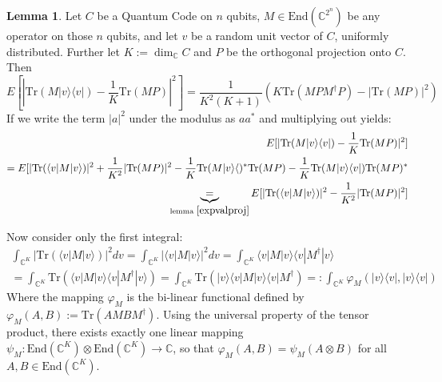 \documentclass{article}
\def\C{\mathbb{C}}
\def\End{\text{End}}
\def\Tr{\text{Tr}}
\theoremstyle{definition}
\newtheorem{lem}[Satz]{Lemma}
\begin{document}
\begin{lem}\label{expvalvec}
Let $C$ be a Quantum Code on $n$ qubits, $M \in \End(\C^{2^n})$ be any operator on those $n$ qubits, and let $v$ be a random unit vector of $C$, uniformly distributed. Further let $K:= \dim_\C C$ and $P$ be the orthogonal projection onto $C$. Then
\begin{equation} E[|\Tr(M|v\rangle \langle v|) - \frac{1}{K}\Tr(MP)|^2] = \frac{1}{K^2(K+1)}(K \Tr(MPM^\dagger P) - |\Tr(MP)|^2) \end{equation}
If we write the term $|a|^2$ under the modulus as $a a^*$ and multiplying out yields:
\begin{align*}
E[|\Tr(M|v\rangle \langle v|) - \frac{1}{K}\Tr(MP)|^2] \\ = E[ |\Tr(\langle v | M | v \rangle )|^2 + \frac{1}{K^2} | \Tr(MP)|^2 - \frac{1}{K} \Tr(M |v \rangle \langle)^* \Tr(MP) - \frac{1}{K} \Tr(M |v\rangle \langle v|) \Tr(MP)^* \\
\underbrace{=}_{\text{lemma }\ref{expvalproj}} E[|\Tr( \langle v|M|v\rangle)|^2 - \frac{1}{K^2}|\Tr(MP)|^2]
\end{align*}

Now consider only the first integral: 
\begin{align*}
\int_{\C^K} |\Tr( \langle v|M|v\rangle)|^2 dv = \int_{\C^K} |\langle v|M|v\rangle|^2 dv =  \int_{\C^K} \langle v|M|v\rangle  \langle v|M^\dagger |v\rangle \\
 =  \int_{\C^K} \Tr (\langle v|M|v\rangle  \langle v|M^\dagger |v\rangle ) =  \int_{\C^K} \Tr(|v \rangle \langle v|M|v\rangle  \langle v|M^\dagger) =: \int_{\C^K} \varphi_M(|v \rangle \langle v|,|v \rangle \langle v|)
\end{align*}
Where the mapping $\varphi_M$ is the bi-linear functional defined by $\varphi_M(A,B):= \Tr(AMBM^\dagger)$. Using the universal property of the tensor product, there exists exactly one linear mapping $\psi_M: \End(\C^K) \otimes \End(\C^K) \rightarrow \C$, so that
$\varphi_M(A,B) = \psi_M(A \otimes B)$ for all $A, B \in \End(\C^K)$.
\end{lem}
\end{document}
